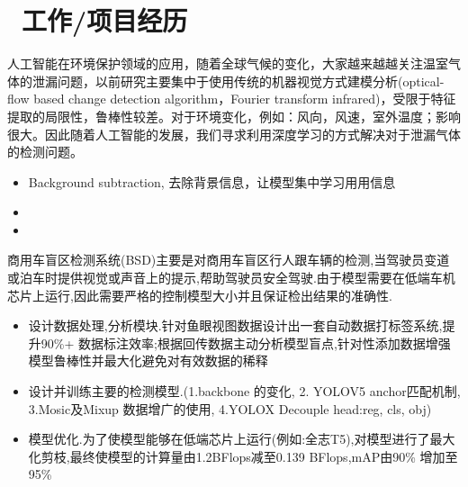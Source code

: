 \documentclass{resume}
\begin{document}



\section{\faUsers\ 工作/项目经历}
\role{Research Assistant}




\begin{onehalfspacing}
人工智能在环境保护领域的应用，随着全球气候的变化，大家越来越越关注温室气体的泄漏问题，以前研究主要集中于使用传统的机器视觉方式建模分析(optical-flow based change detection algorithm，Fourier transform infrared)，受限于特征提取的局限性，鲁棒性较差。对于环境变化，例如：风向，风速，室外温度；影响很大。因此随着人工智能的发展，我们寻求利用深度学习的方式解决对于泄漏气体的检测问题。


\begin{itemize}
  \item Background subtraction, 去除背景信息，让模型集中学习用用信息
  \item 
  \item 
\end{itemize}
\end{onehalfspacing}

\begin{onehalfspacing}
商用车盲区检测系统(BSD)主要是对商用车盲区行人跟车辆的检测,当驾驶员变道或泊车时提供视觉或声音上的提示,帮助驾驶员安全驾驶.由于模型需要在低端车机芯片上运行,因此需要严格的控制模型大小并且保证检出结果的准确性.

\begin{itemize}
  \item 设计数据处理,分析模块.针对鱼眼视图数据设计出一套自动数据打标签系统,提升90\%+ 数据标注效率;根据回传数据主动分析模型盲点,针对性添加数据增强模型鲁棒性并最大化避免对有效数据的稀释
  \item 设计并训练主要的检测模型.(1.backbone 的变化, 2. YOLOV5 anchor匹配机制, 3.Mosic及Mixup 数据增广的使用, 4.YOLOX Decouple head:reg, cls, obj)
  \item 模型优化.为了使模型能够在低端芯片上运行(例如:全志T5),对模型进行了最大化剪枝,最终使模型的计算量由1.2BFlops减至0.139 BFlops,mAP由90\% 增加至 95\%
\end{itemize}
\end{onehalfspacing}
\end{document}
